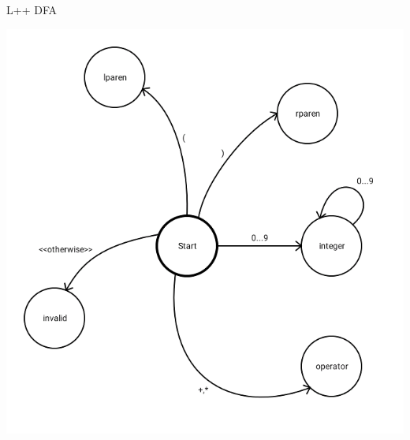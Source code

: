 \documentclass[]{beamer}
\begin{document}
\begin{frame}{L++ DFA}
    \begin{center}
        \includegraphics[height=0.95\textheight]{images/lpp}
    \end{center}
\end{frame}
\end{document}
